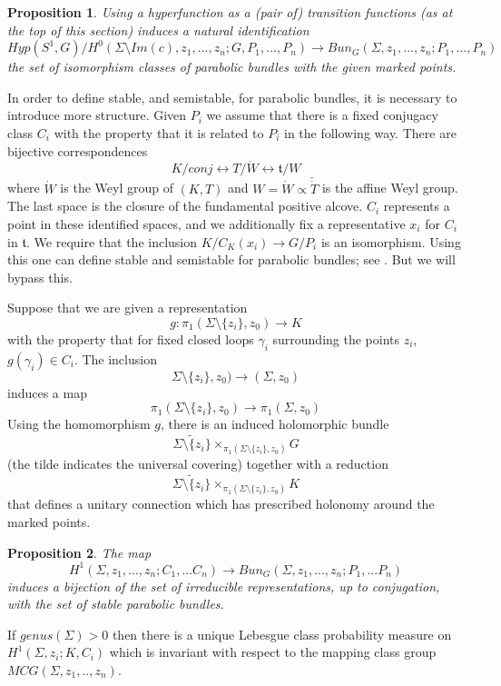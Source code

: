 \documentclass{amsart}
\newtheorem{proposition}{Proposition}
\theoremstyle{conjecture}
\theoremstyle{definition}
\theoremstyle{question}
\theoremstyle{questions}
\theoremstyle{remark}
\theoremstyle{remarks}
\theoremstyle{example}
\numberwithin{equation}{section}
\begin{document}
\begin{proposition} Using a hyperfunction as a (pair of) transition functions (as at the top of this section) induces
a natural identification
$$Hyp(S^1,G)/H^0(\Sigma\setminus Im(c),z_1,...,z_n;G,P_1,...,P_n) \to Bun_G(\Sigma,z_1,...,z_n;P_1,...,P_n)$$
the set of isomorphism classes of parabolic bundles with the given marked points.
\end{proposition}


In order to define stable, and semistable, for parabolic bundles,
it is necessary to introduce more structure.  Given
$P_i$ we assume that there is a fixed conjugacy class $C_i$
with the property that it is related to $P_i$ in the
following way.  There are bijective correspondences
$$K/conj\leftrightarrow T/\dot W \leftrightarrow \mathfrak t/W$$
where $\dot W$ is the Weyl group of $(K,T)$ and  $W=\dot W\propto\check{\dot T}$ is the affine Weyl group.
The last space is the closure of the fundamental positive alcove.
$C_i$ represents a point in these identified spaces, and we
additionally fix a representative $x_i$ for $C_i$ in $\mathfrak t$. We
require that the inclusion $K/C_K(x_i)\to G/P_i$ is an isomorphism.
Using this one can define stable and semistable for parabolic bundles;
see \cite{TW}. But we will bypass this.

Suppose that we are given a representation
$$g:\pi_1(\Sigma\setminus\{z_i\},z_0) \to K $$
with the property that for fixed closed loops $\gamma_i$ surrounding the points $z_i$,
$g(\gamma_i)\in C_i$. The inclusion
$$\Sigma\setminus\{z_i\},z_0) \to (\Sigma,z_0)$$
induces a map
$$\pi_1(\Sigma\setminus\{z_i\},z_0) \to \pi_1(\Sigma,z_0)$$
Using the homomorphism $g$, there is an induced holomorphic bundle
$$\widetilde{\Sigma\setminus\{z_i\}}\times_{\pi_1(\Sigma\setminus\{z_i\},z_0)} G $$
(the tilde indicates the universal covering) together with a reduction
$$\widetilde{\Sigma\setminus\{z_i\}}\times_{\pi_1(\Sigma\setminus\{z_i\},z_0)} K $$
that defines a unitary connection which has prescribed holonomy around the marked points.

\begin{proposition}The map
$$H^1(\Sigma,z_1,...,z_n;C_1,...C_n) \to Bun_G(\Sigma,z_1,...,z_n;P_1,...P_n)$$
induces a bijection of the set of irreducible
representations, up to conjugation, with the set of stable parabolic bundles.
\end{proposition}

If $genus(\Sigma )>0$ then there is a
unique Lebesgue class probability measure on
$H^1(\Sigma ,z_i;K,C_i)$ which is invariant with respect to the mapping class
group $MCG(\Sigma ,z_1,..,z_n)$.
\end{document}
